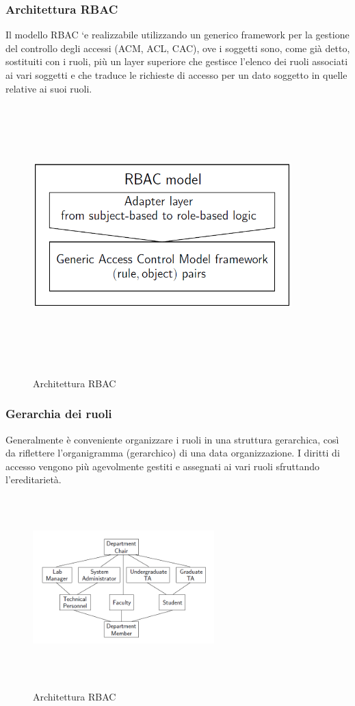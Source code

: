 \subsubsection{Architettura RBAC}
Il modello RBAC `e realizzabile utilizzando un generico framework per la gestione del controllo degli accessi (ACM, ACL, CAC), ove i soggetti sono, come già detto, sostituiti con i ruoli, più un layer superiore che gestisce l'elenco dei ruoli associati ai vari soggetti e che traduce le richieste di accesso per un dato soggetto in quelle relative ai suoi ruoli.
\begin{figure}[htbp]
	\centering%
	\subfigure%
	{\includegraphics[height=10cm, width=10cm, keepaspectratio]{Immagini/introduzione/RBAC_arch.png}}
	\caption{Architettura RBAC \label{fig:RBAC_arch}} 	
\end{figure}

\subsubsection{Gerarchia dei ruoli}
Generalmente è conveniente organizzare i ruoli in una struttura gerarchica, così da riflettere l’organigramma (gerarchico) di una data organizzazione. I diritti di accesso vengono più agevolmente gestiti e assegnati ai vari ruoli sfruttando l’ereditarietà.
\begin{figure}[htbp]
	\centering%
	\subfigure%
	{\includegraphics[height=7cm, width=7cm, keepaspectratio]{Immagini/introduzione/RBAC_ger.png}}
	\caption{Architettura RBAC \label{fig:RBAC_ger}} 	
\end{figure}

